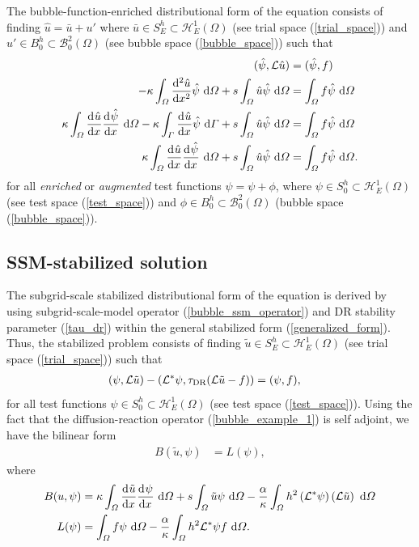 The bubble-function-enriched distributional form of the equation consists of finding $\hat{u} = \bar{u} + u'$ where $\bar{u} \in S_E^h \subset \mathcal{H}_E^1(\Omega)$ (see trial space (\ref{trial_space})) and $u' \in B_0^h \subset \mathcal{B}_0^2(\Omega)$ (see bubble space (\ref{bubble_space})) such that
\begin{align*}
  (\hat{\psi}, \Lu \hat{u}) &= (\hat{\psi}, f) \\
  -\kappa \int_{\Omega} \totder[2]{\hat{u}}{x} \hat{\psi} \d{\Omega} + s\int_{\Omega} \hat{u} \hat{\psi} \d{\Omega} &= \int_{\Omega} f \hat{\psi} \d{\Omega} \\
  \kappa \int_{\Omega} \totder{\hat{u}}{x} \totder{\hat{\psi}}{x} \d{\Omega} - \kappa \int_{\Gamma} \totder{\hat{u}}{x} \hat{\psi} \d{\Gamma} + s\int_{\Omega} \hat{u} \hat{\psi} \d{\Omega} &= \int_{\Omega} f \hat{\psi} \d{\Omega} \\
  \kappa \int_{\Omega} \totder{\hat{u}}{x} \totder{\hat{\psi}}{x} \d{\Omega} + s\int_{\Omega} \hat{u} \hat{\psi} \d{\Omega} &= \int_{\Omega} f \hat{\psi} \d{\Omega}.
\end{align*}
for all \emph{enriched} or \emph{augmented} test functions $\hat{\psi} = \psi + \phi$, where $\psi \in S_0^h \subset \mathcal{H}_E^1(\Omega)$ (see test space (\ref{test_space})) and $\phi \in B_0^h \subset \mathcal{B}_0^2(\Omega)$ (bubble space (\ref{bubble_space})).

\subsection{SSM-stabilized solution}

The subgrid-scale stabilized distributional form of the equation is derived by using subgrid-scale-model operator (\ref{bubble_ssm_operator}) and DR stability parameter (\ref{tau_dr}) within the general stabilized form (\ref{generalized_form}).  Thus, the stabilized problem consists of finding $\tilde{u} \in S_E^h \subset \mathcal{H}_E^1(\Omega)$ (see trial space (\ref{trial_space})) such that
\begin{align*}
  (\psi, \Lu \tilde{u}) - (\Lu^* \psi, \tau_{\text{DR}} (\Lu \tilde{u} - f)) &= (\psi, f),
\end{align*}
for all test functions $\psi \in S_0^h \subset \mathcal{H}_E^1(\Omega)$ (see test space (\ref{test_space})).  Using the fact that the diffusion-reaction operator (\ref{bubble_example_1}) is self adjoint, we have the bilinear form
\begin{align*}
  B(\tilde{u},\psi) &= L(\psi),
\end{align*}
where
{\footnotesize
\begin{align*} 
  B(u,\psi) &= \kappa \int_{\Omega} \totder{\tilde{u}}{x} \totder{\psi}{x} \d{\Omega} + s\int_{\Omega} \tilde{u} \psi \d{\Omega} - \frac{\alpha}{\kappa} \int_{\Omega} h^2 \left( \Lu^* \psi \right) \left( \Lu \tilde{u} \right) \d{\Omega} \\
  L(\psi) &= \int_{\Omega} f \psi \d{\Omega} - \frac{\alpha}{\kappa} \int_{\Omega} h^2 \Lu^* \psi f \d{\Omega}.
\end{align*}}

